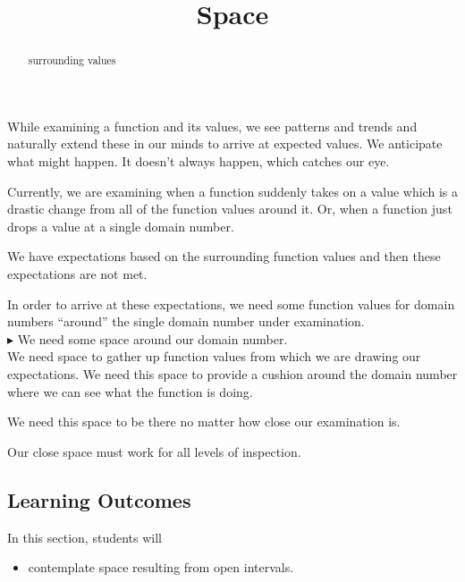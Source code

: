 \documentclass{ximera}
\title{Space}
\begin{document}
\begin{abstract}
surrounding values
\end{abstract}
\maketitle




While examining a function and its values, we see patterns and trends and naturally extend these in our minds to arrive at expected values. We anticipate what might happen.  It doesn't always happen, which catches our eye.

Currently, we are examining when a function suddenly takes on a value which is a drastic change from all of the function values around it.  Or, when a function just drops a value at a single domain number.

We have expectations based on the surrounding function values and then these expectations are not met.

In order to arrive at these expectations, we need some function values for domain numbers ``around'' the single domain number under examination. \\


$\blacktriangleright$ We need some space around our domain number. \\




We need space to gather up function values from which we are drawing our expectations.  We need this space to provide a cushion around the domain number where we can see what the function is doing.


We need this space to be there no matter how close our examination is.  


Our close space must work for all levels of inspection.















\subsection{Learning Outcomes}


\begin{sectionOutcomes}
In this section, students will 

\begin{itemize}
\item contemplate space resulting from open intervals.
\end{itemize}
\end{sectionOutcomes}
\end{document}
